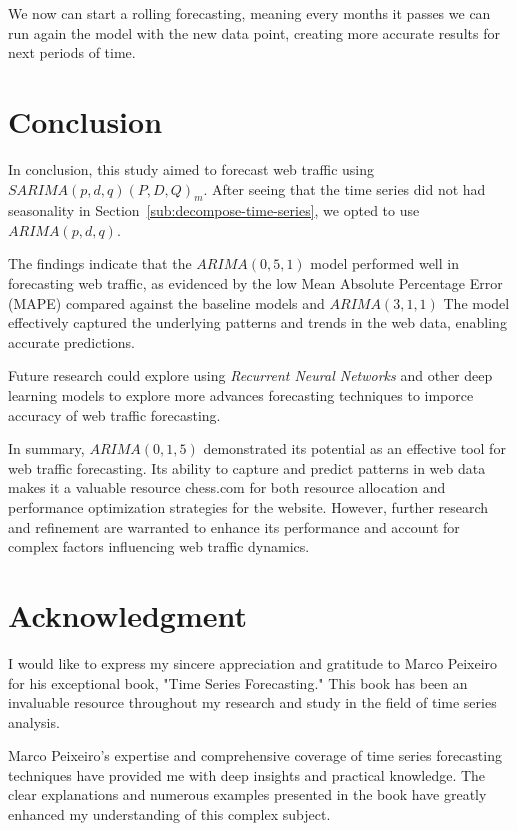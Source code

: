 \documentclass[journal]{IEEEtran}
\begin{document}
We now can start a rolling forecasting, meaning every months it passes we can
run again the model with the new data point,  creating more accurate results
for next periods of time.

\section{Conclusion}\label{sec:conclusion}

In conclusion, this study aimed to forecast web traffic using
$SARIMA(p,d,q)(P,D,Q)_m$. After seeing that the time series did not had
seasonality in Section~\ref{sub:decompose-time-series}, we opted to use
$ARIMA(p,d,q)$.

The findings indicate that the $ARIMA(0,5,1)$ model performed well in
forecasting web traffic, as evidenced by the low Mean Absolute Percentage
Error (MAPE) compared against the baseline models and $ARIMA(3,1,1)$  The
model effectively captured the underlying patterns and trends in the web data,
enabling accurate predictions.

Future research could explore using \emph{Recurrent Neural Networks} and other
deep learning models to explore more advances forecasting techniques to
imporce accuracy of web traffic forecasting.

In summary, $ARIMA(0,1,5)$ demonstrated its potential as an effective tool for
web traffic forecasting. Its ability to capture and predict patterns in web
data makes it a valuable resource chess.com for both resource allocation and
performance optimization strategies for the website. However, further research
and refinement are warranted to enhance its performance and account for
complex factors influencing web traffic dynamics.

\section*{Acknowledgment}
I would like to express my sincere appreciation and gratitude to Marco
Peixeiro for his exceptional book, "Time Series Forecasting." This book has
been an invaluable resource throughout my research and study in the field of
time series analysis.

Marco Peixeiro's expertise and comprehensive coverage of time series
forecasting techniques have provided me with deep insights and practical
knowledge. The clear explanations and numerous examples presented in the book
have greatly enhanced my understanding of this complex subject.



\end{document}
